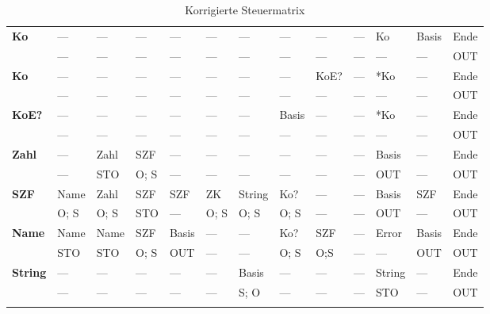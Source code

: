 \begin{table}[H]
\begin{tabular}{@{}l|*{12}{l}@{}}
		\multirow{2}{*}{{\bfseries\scriptsize Ko}}		&
		  ---		& ---		& ---	& ---		& ---		& ---		& --- & --- & --- & Ko	& Basis & Ende \\
		& ---		& ---		& ---	& ---		& ---		& ---		& ---	& ---	& ---	& ---	& --- & OUT    \\
		\cmidrule{1-13}		
			
		\multirow{2}{*}{{\bfseries\scriptsize *Ko}}		&
		  ---		& ---		& ---	& ---		& ---		& ---		& --- & KoE?	& --- & *Ko	& --- & Ende \\
		& ---		& ---		& ---	& ---		& ---		& ---		& ---	& ---		& ---	& ---	& --- & OUT	\\
		\cmidrule{1-13}			
			
		\multirow{2}{*}{{\bfseries\scriptsize KoE?}}	&
		  ---		& ---		& ---	& ---		& ---		& ---		& Basis	& ---	& --- & *Ko	& --- & Ende \\
		& ---		& ---		& ---	& ---		& ---		& ---		& ---		& ---	& ---	& ---	& --- & OUT	\\
		\cmidrule{1-13}		
			
		\multirow{2}{*}{{\bfseries\scriptsize Zahl}}	&
		  ---		& Zahl	& SZF		& ---		& ---		& ---		& ---	& ---	& --- & Basis	& --- & Ende \\
		& ---		& STO		& O; S	& ---		& ---		& ---		& ---	& ---	& ---	& OUT		& --- & OUT	\\
		\cmidrule{1-13}		

		\multirow{2}{*}{{\bfseries\scriptsize SZF}}		&
		  Name	& Zahl	& SZF	& SZF	& ZK		& String	& Ko?		& ---	& --- & Basis	& SZF & Ende \\
		& O; S	& O; S	& STO	& ---	& O; S	& O; S		& O; S	& ---	& ---	& OUT		& --- & OUT	\\
		\cmidrule{1-13}
		
		\multirow{2}{*}{{\bfseries\scriptsize Name}}	&
		  Name	& Name	& SZF		& Basis	& ---	& ---	& Ko?		& SZF	& --- & Error	& Basis & Ende \\
		& STO		& STO		& O; S	& OUT		& ---	& ---	& O; S	& O;S	& ---	& ---	  & OUT & OUT	\\
		\cmidrule{1-13}

		\multirow{2}{*}{{\bfseries\scriptsize String}}	&
		  ---		& ---		& ---	& ---		& ---		& Basis	& ---	& ---	& --- & String	& --- & Ende \\
		& ---		& ---		& ---	& ---		& ---		& S; O	& ---	& ---	& ---	& STO			& --- & OUT	\\
						
		\addlinespace
		\bottomrule
		
		\end{tabular}
	\caption{Korrigierte Steuermatrix}
	\label{tab:Steuermatrix}
\end{table}